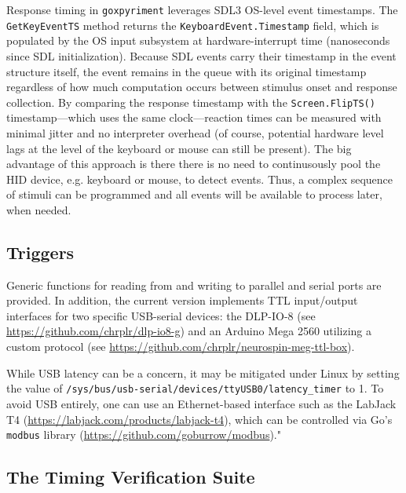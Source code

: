 \documentclass[man,a4paper]{apa7}
\begin{document}
Response timing in \texttt{goxpyriment} leverages SDL3 OS-level event
timestamps. The \texttt{GetKeyEventTS} method returns the
\texttt{KeyboardEvent.Timestamp} field, which is populated by the OS
input subsystem at hardware-interrupt time (nanoseconds since SDL
initialization).  Because SDL events carry their timestamp in the
event structure itself, the event remains in the queue with its
original timestamp regardless of how much computation occurs between
stimulus onset and response collection.  By comparing the response
timestamp with the \texttt{Screen.FlipTS()} timestamp---which uses the
same clock---reaction times can be measured with minimal jitter and no
interpreter overhead (of course, potential hardware level lags at the
level of the keyboard or mouse can still be present). The big
advantage of this approach is there there is no need to continusously
pool the HID device, e.g. keyboard or mouse, to detect events. Thus, a
complex sequence of stimuli can be programmed and all events will be
available to process later, when needed.

\subsection{Triggers}

Generic functions for reading from and writing to parallel and serial
ports are provided. In addition, the current version implements TTL
input/output interfaces for two specific USB-serial devices: the
DLP-IO-8 (see \url{https://github.com/chrplr/dlp-io8-g}) and an
Arduino Mega 2560 utilizing a custom protocol (see
\url{https://github.com/chrplr/neurospin-meg-ttl-box}).

While USB latency can be a concern, it may be mitigated under Linux by
setting the value of
\texttt{/sys/bus/usb-serial/devices/ttyUSB0/latency\_timer} to 1. To
avoid USB entirely, one can use an Ethernet-based interface such as
the LabJack T4 (\url{https://labjack.com/products/labjack-t4}), which
can be controlled via Go's \texttt{modbus} library
(\url{https://github.com/goburrow/modbus})."

\subsection{The Timing Verification Suite}\label{timing-verification}
\end{document}
